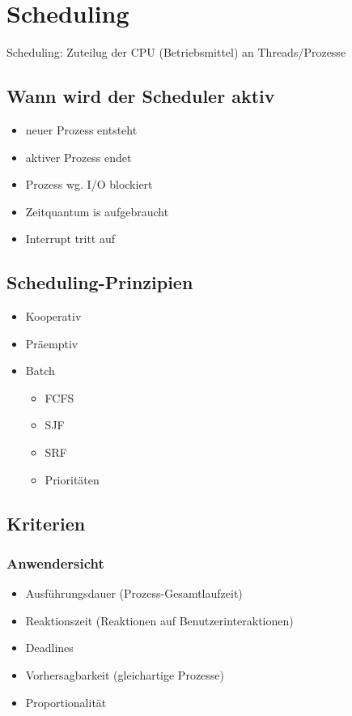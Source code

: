 \section{Scheduling}

Scheduling: Zuteilug der CPU (Betriebsmittel) an Threads/Prozesse

\subsection{Wann wird der Scheduler aktiv}
\begin{itemize}
    \item neuer Prozess entsteht
    \item aktiver Prozess endet
    \item Prozess wg. I/O blockiert
    \item Zeitquantum is aufgebraucht
    \item Interrupt tritt auf
\end{itemize}

\subsection{Scheduling-Prinzipien}
\begin{itemize}
    \item Kooperativ
    \item Präemptiv
    \item Batch
    \begin{itemize}
        \item FCFS
        \item SJF
        \item SRF
        \item Prioritäten
    \end{itemize}
\end{itemize}

\subsection{Kriterien}

\subsubsection{Anwendersicht}
\begin{itemize}
    \item Ausführungsdauer (Prozess-Gesamtlaufzeit)
    \item Reaktionszeit (Reaktionen auf Benutzerinteraktionen)
    \item Deadlines
    \item Vorhersagbarkeit (gleichartige Prozesse)
    \item Proportionalität
\end{itemize}

